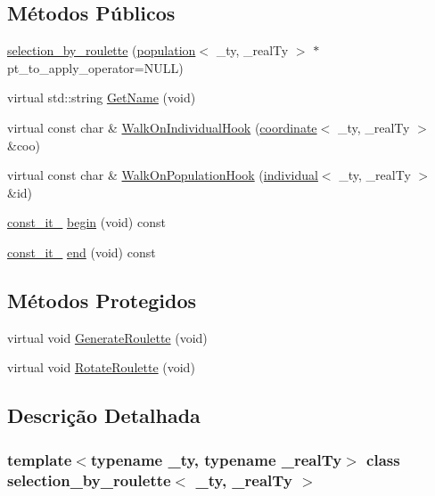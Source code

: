 \subsection*{Métodos Públicos}
\begin{DoxyCompactItemize}
\item 
\hyperlink{classselection__by__roulette_a043cefe0479622491fea593c7f28ddfa}{selection\_\-by\_\-roulette} (\hyperlink{classpopulation}{population}$<$ \_\-ty, \_\-realTy $>$ $\ast$pt\_\-to\_\-apply\_\-operator=NULL)
\item 
virtual std::string \hyperlink{classselection__by__roulette_a137f1a757ab4d71a0ca0bdba7f9f35d0}{GetName} (void)
\item 
virtual const char \& \hyperlink{classselection__by__roulette_abb536fd7b63a452a2ebd8e7572bfc4d8}{WalkOnIndividualHook} (\hyperlink{classcoordinate}{coordinate}$<$ \_\-ty, \_\-realTy $>$ \&coo)
\item 
virtual const char \& \hyperlink{classselection__by__roulette_a98be3d54afb87450f190615f7da330e9}{WalkOnPopulationHook} (\hyperlink{classindividual}{individual}$<$ \_\-ty, \_\-realTy $>$ \&id)
\item 
\hyperlink{classselection__by__roulette_ac64df0d86cf8396ce91df17d9ce27f0e}{const\_\-it\_\-} \hyperlink{classselection__by__roulette_a8d04a76229aa2d0c68c1a945e77d8e19}{begin} (void) const 
\item 
\hyperlink{classselection__by__roulette_ac64df0d86cf8396ce91df17d9ce27f0e}{const\_\-it\_\-} \hyperlink{classselection__by__roulette_a2abe33c34280ba81f0f0dab12c8e875b}{end} (void) const 
\end{DoxyCompactItemize}
\subsection*{Métodos Protegidos}
\begin{DoxyCompactItemize}
\item 
virtual void \hyperlink{classselection__by__roulette_ac3db5bbe67ee2aa4e1942fd983d3cc80}{GenerateRoulette} (void)
\item 
virtual void \hyperlink{classselection__by__roulette_ae19e7e752f54ab03983be567c8d10392}{RotateRoulette} (void)
\end{DoxyCompactItemize}


\subsection{Descrição Detalhada}
\subsubsection*{template$<$typename \_\-ty, typename \_\-realTy$>$ class selection\_\-by\_\-roulette$<$ \_\-ty, \_\-realTy $>$}

